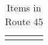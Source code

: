 \begin{longtable}{|| l l l l ||}%
\hline%
\endhead%
\hline%
\caption{Items in Route 45}%
\label{tab:Route45Items}%
\end{longtable}